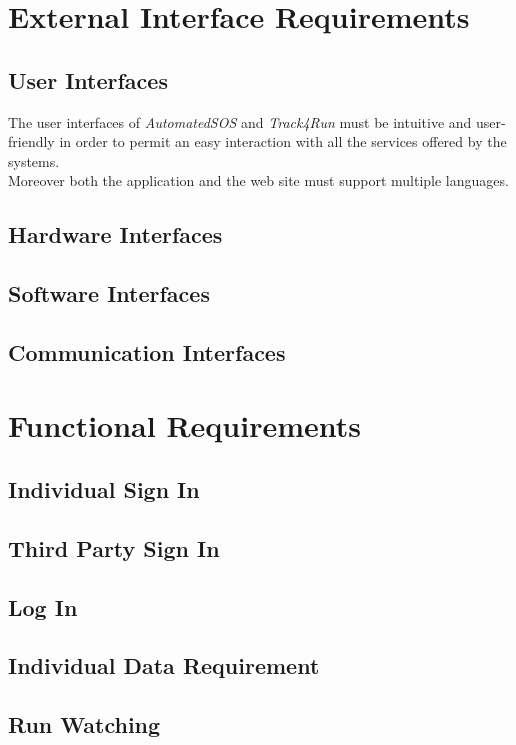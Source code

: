 \section{External Interface Requirements}

\subsection{User Interfaces}
The user interfaces of \textit{AutomatedSOS} and \textit{Track4Run} must be intuitive and user-friendly in order to permit an easy interaction with all the services offered by the systems.\\
Moreover both the application and the web site must support multiple languages.

\subsection{Hardware Interfaces}

\subsection{Software Interfaces}

\subsection{Communication Interfaces}

\clearpage
\section{Functional Requirements}

\subsection{Individual Sign In}

\clearpage

\subsection{Third Party Sign In}

\clearpage

\subsection{Log In}

\clearpage

\subsection{Individual Data Requirement}

\clearpage

\subsection{Run Watching}

\clearpage
